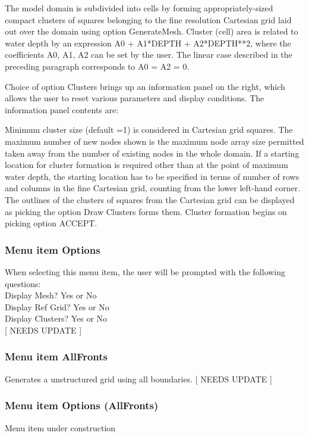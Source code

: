 \documentclass{article}
\begin{document}
The model domain is subdivided into cells by forming appropriately-sized compact clusters of squares belonging to the fine resolution Cartesian grid laid out over the domain using option GenerateMesh. Cluster (cell) area is related to water depth by an expression A0 + A1*DEPTH + A2*DEPTH**2, where the coefficients A0, A1, A2 can be set by the user. The linear case described in the preceding paragraph corresponds to A0 = A2 = 0.

Choice of option Clusters brings up an information panel on the right, which allows the user to reset various parameters and display conditions. The information panel contents are:

Minimum cluster size (default =1) is considered in Cartesian grid squares. The maximum number of new nodes shown is the maximum node array size permitted taken away from the number of existing nodes in the whole domain. If a starting location for cluster formation is required other than at the point of maximum water depth, the starting location has to be specified in terms of number of rows and columns in the fine Cartesian grid, counting from the lower left-hand corner. The outlines of the clusters of squares from the Cartesian grid can be displayed as picking the option Draw Clusters forms them. Cluster formation begins on picking option ACCEPT.

\subsubsection[Menu item Options]{Menu item Options}

When selecting this menu item, the user will be prompted with the following questions:\\
Display Mesh? Yes or No\\
Display Ref Grid? Yes or No\\
Display Clusters? Yes or No\\

[ NEEDS UPDATE ]

\subsubsection[Menu item AllFronts]{Menu item AllFronts}
Generates a unstructured grid using all boundaries.
[ NEEDS UPDATE ]

\subsubsection[Menu item Options (AllFronts)]{Menu item Options (AllFronts)}
Menu item under construction
\end{document}
